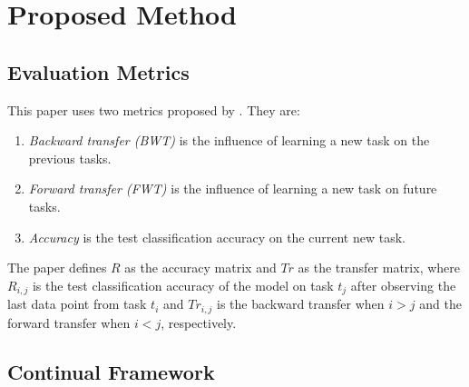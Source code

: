 \documentclass[11pt,a4paper]{article}
\begin{document}

\section{Proposed Method}
\label{sec:prop_method}

\subsection{Evaluation Metrics}
\label{sec:metric}
This paper uses two metrics proposed by \citeauthor{DBLP:journals/corr/Lopez-PazR17}. They are:
\begin{enumerate}
    \item \textit{Backward transfer (BWT)} is the influence of learning a new task on the previous tasks. 
    \item \textit{Forward transfer (FWT)} is the influence of learning a new task on future tasks.
    \item \textit{Accuracy} is the test classification accuracy on the current new task.
\end{enumerate}

The paper defines $R$ as the accuracy matrix and $Tr$ as the transfer matrix, where $R_{i, j}$ is the test classification accuracy of the model on task $t_j$ after observing the last data point from task $t_i$ and $Tr_{i, j}$ is the backward transfer when $i > j$ and the forward transfer when $i < j$, respectively.

\subsection{Continual Framework}
\end{document}
